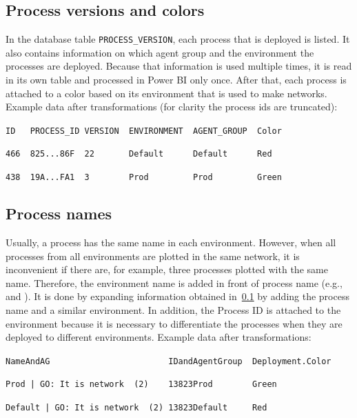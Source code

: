 \documentclass[english, 12pt, a4paper, sci, utf8, a-2b, online, obeyspaces]{aaltothesis}
\begin{document}
\subsection{Process versions and colors}
\label{sec:processes_versions_and_colors}
In the database table \verb|PROCESS_VERSION|, each process that is deployed is listed. It also contains information on which agent group and the environment the processes are deployed. Because that information is used multiple times, it is read in its own table and processed in Power BI only once. After that, each process is attached to a color based on its environment that is used to make networks. Example data after transformations (for clarity the process ids are truncated):

\nopagebreak
\verb=ID   PROCESS_ID VERSION  ENVIRONMENT  AGENT_GROUP  Color=

\nopagebreak
\verb=466  825...86F  22       Default      Default      Red=

\nopagebreak
\verb=438  19A...FA1  3        Prod         Prod         Green=

\subsection{Process names} 
Usually, a process has the same name in each environment. However, when all processes from all environments are plotted in the same network, it is inconvenient if there are, for example, three processes plotted with the same name. Therefore, the environment name is added in front of process name (e.g.,  and ). It is done by expanding information obtained in~\ref{sec:processes_versions_and_colors} by adding the process name and a similar environment. In addition, the Process ID is attached to the environment because it is necessary to differentiate the processes when they are deployed to different environments. Example data after transformations:

\nopagebreak
\verb=NameAndAG                        IDandAgentGroup  Deployment.Color=

\nopagebreak
\verb=Prod | GO: It is network  (2)    13823Prod        Green=

\nopagebreak
\verb=Default | GO: It is network  (2) 13823Default     Red=
\end{document}
